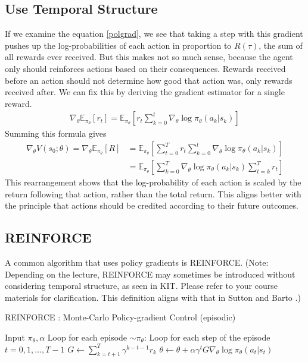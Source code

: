 \subsection{Use Temporal Structure}
If we examine the equation \ref{polgrad}, we see that taking a step with this 
gradient pushes up the log-probabilities of each action in proportion to $R(\tau)$, 
the sum of all rewards ever received. But this makes not so much sense, because the 
agent only should reinforces actions based on their consequences. Rewards received 
before an action should not determine how good that action was, only rewards 
received after. We can fix this by deriving the gradient estimator for a single reward. 
\begin{align*}
    \nabla_{\theta}\mathbb{E}_{\pi_\theta}[r_t] = \mathbb{E}_{\pi_\theta}
    \left[r_t \sum_{k=0}^t \nabla_{\theta}\log{\pi_{\theta}(a_k|s_k)}\right]
\end{align*}
Summing this formula gives 
\begin{align}
     \nabla_{\theta} V(s_0;\theta) = \nabla_{\theta}\mathbb{E}_{\pi_\theta}[R] &=  
     \mathbb{E}_{\pi_\theta}\left[\sum_{t=0}^{T}r_t \sum_{k=0}^t \nabla_{\theta}
     \log{\pi_{\theta} (a_k|s_k)}\right] \nonumber \\
     &= \mathbb{E}_{\pi_\theta}\left[\sum_{k=0}^{T} \nabla_{\theta}
     \log{\pi_{\theta} (a_k|s_k) \sum_{t=k}^{T}r_t}\right] \label{polygrad_td}
\end{align}
This rearrangement shows that the log-probability of each action is scaled by the return following that action, rather than
the total return. This aligns better with the principle that actions should be credited according to their future outcomes.
\subsection{REINFORCE}
A common algorithm that uses policy gradients is REINFORCE. (Note: Depending on the lecture, 
REINFORCE may sometimes be introduced without considering temporal structure, as seen in KIT. 
Please refer to your course materials for clarification. This definition aligns with that in 
Sutton and Barto \cite{10.5555/3312046}.)
\begin{algorithm}[H]
  \large
    \caption{REINFORCE : Monte-Carlo Policy-gradient Control (episodic)}\label{REINFORCE}
    \begin{algorithmic}
        \STATE Input $\pi_{\theta}, \alpha$
        \STATE Loop for each episode $\sim \pi_{\theta}$:
        \STATE \quad Loop for each step of the episode $t = 0,1,\dots,T-1$
        \STATE \qquad $G \gets \sum_{k = t+1}^T \gamma^{k-t-1} r_k$
        \STATE \qquad $\theta \gets \theta + \alpha \gamma^t G \nabla_{\theta} \log{\pi_{\theta}(a_t|s_t)}$
    \end{algorithmic}
\end{algorithm}

